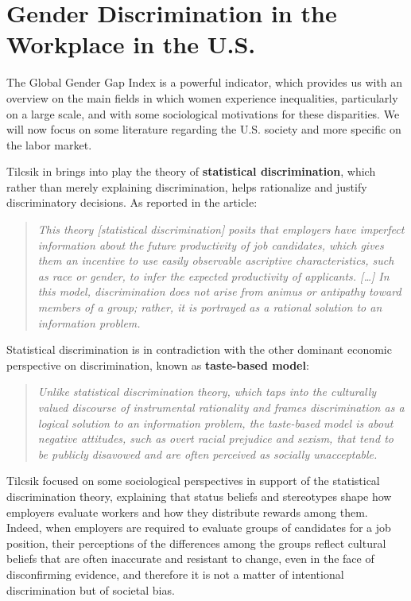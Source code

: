 \section{Gender Discrimination in the Workplace in the U.S.}
The Global Gender Gap Index is a powerful indicator, which provides us with an overview on the main fields in which women experience inequalities, particularly on a large scale, and with some sociological motivations for these disparities. We will now focus on some literature regarding the U.S. society and more specific on the labor market.

Tilcsik in \cite{tilcsik2021statistical} brings into play the theory of \textbf{statistical discrimination}, which rather than merely explaining discrimination, helps rationalize and justify discriminatory decisions. As reported in the article:
\begin{quote}\emph{This theory \emph{[statistical discrimination]} posits that employers have imperfect information about the future productivity of job candidates, which gives them an incentive to use easily observable ascriptive characteristics, such as race or gender, to infer the expected productivity of applicants. \emph{[\ldots]} In this model, discrimination does not arise from animus or antipathy toward members of a group; rather, it is portrayed as a rational solution to an information problem.} \cite[p.~94]{tilcsik2021statistical}\end{quote}

Statistical discrimination is in contradiction with the other dominant economic perspective on discrimination, known as \textbf{taste-based model}:
\begin{quote}\emph{Unlike statistical discrimination theory, which taps into the culturally valued discourse of instrumental rationality and frames discrimination as a logical solution to an information problem, the taste-based model is about negative attitudes, such as overt racial prejudice and sexism, that tend to be publicly disavowed and are often perceived as socially unacceptable.} \cite[p.~95]{tilcsik2021statistical}\end{quote}

Tilcsik focused on some sociological perspectives in support of the statistical discrimination theory, explaining that status beliefs and stereotypes shape how employers evaluate workers and how they distribute rewards among them. Indeed, when employers are required to evaluate groups of candidates for a job position, their perceptions of the differences among the groups reflect cultural beliefs that are often inaccurate and resistant to change, even in the face of disconfirming evidence, and therefore it is not a matter of intentional discrimination but of societal bias.

